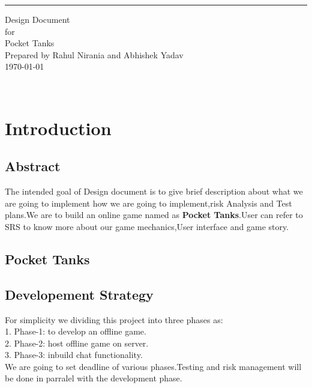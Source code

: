 \documentclass{scrreprt}
\date{}
\begin{document}
\begin{flushleft}
    \rule{16cm}{5pt}\vskip1cm
    \begin{bfseries}
        \Huge{Design Document}\\
        \vspace{0.5cm}
        for\\
        \vspace{0.5cm}
        Pocket Tanks\\
        \vspace{2.0cm}
        Prepared by Rahul Nirania and Abhishek Yadav\\
        \vspace{1.9cm}
        \today\\
    \end{bfseries}
\end{flushleft}

\tableofcontents

\

\chapter{Introduction}

\section{Abstract}
The intended goal of Design document is to give brief description about what we are going to implement how we are going to implement,risk Analysis and Test plans.We are to build an online game named as \textbf{Pocket Tanks}.User can refer to SRS to know more about our game mechanics,User interface and game story.\\

\section{Pocket Tanks}

\section{Developement Strategy}
For simplicity we dividing this project into three phases as:\\
1. Phase-1: to develop an offline game.\\
2. Phase-2: host offline game on server.\\
3. Phase-3: inbuild chat functionality.\\
We are going to set deadline of various phases.Testing and risk management will be done in parralel with the development phase. 
\end{document}
